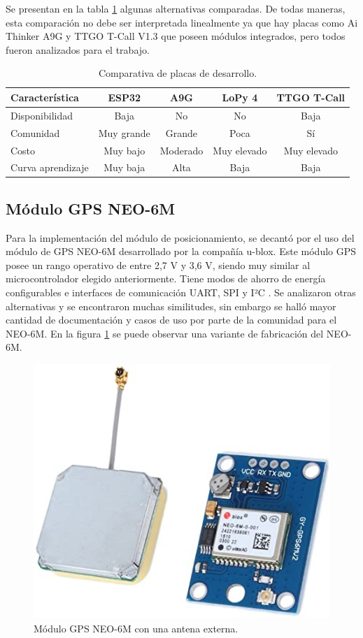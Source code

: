 Se presentan en la tabla \ref{tab:comparativa-placas} algunas alternativas comparadas. De todas maneras, esta comparación no debe ser interpretada linealmente ya que hay placas como Ai Thinker A9G y TTGO T-Call V1.3 que poseen módulos integrados, pero todos fueron analizados para el trabajo.

\begin{table}[h]
	\centering
	\caption[Comparativa de placas de desarrollo.]{Comparativa de placas de desarrollo.}
	\begin{tabular}{l c c c c}    
		\toprule
		\textbf{Característica} 	 & \textbf{ESP32} & \textbf{A9G} & \textbf{LoPy 4} & \textbf{TTGO T-Call}  \\
		\midrule
		Disponibilidad & Baja & No & No & Baja			\\		
		Comunidad & Muy grande & Grande & Poca & Sí			\\
		Costo & Muy bajo & Moderado & Muy elevado & Muy elevado		\\
		Curva aprendizaje & Muy baja & Alta & Baja & Baja \\
		\bottomrule
		\hline
	\end{tabular}
	\label{tab:comparativa-placas}
\end{table}

\subsection{Módulo GPS NEO-6M}

Para la implementación del módulo de posicionamiento, se decantó por el uso del módulo de GPS NEO-6M desarrollado por la compañía u-blox. Este módulo GPS posee un rango operativo de entre 2,7 V y 3,6 V, siendo muy similar al microcontrolador elegido anteriormente. Tiene modos de ahorro de energía configurables e interfaces de comunicación UART, SPI y I²C \citep{NEO6M:1}. Se analizaron otras alternativas y se encontraron muchas similitudes, sin embargo se halló mayor cantidad de documentación y casos de uso por parte de la comunidad para el NEO-6M. En la figura \ref{fig:neo6m} se puede observar una variante de fabricación del NEO-6M.

\begin{figure}[H]
	\centering
	\includegraphics[width=.6\textwidth]{./Figures/neo-6m.jpg}
	\caption{Módulo GPS NEO-6M con una antena externa.}
	\label{fig:neo6m}
\end{figure}

